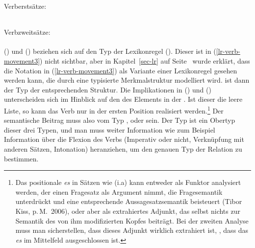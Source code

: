 \eas
Verberstsätze:\\
 \impl\\
\zs

\eas
\label{impl-v2}%
Verbzweitsätze:\\
 \impl\\
\zs
() und () beziehen sich auf den Typ der Lexikonregel ().
Dieser ist in (\ref{lr-verb-movement3}) nicht sichtbar, aber in Kapitel~\ref{sec-lr}
auf Seite~\pageref{pageref-lr-mit-dtr} wurde erklärt, dass die Notation in (\ref{lr-verb-movement3})
als Variante einer Lexikonregel gesehen werden kann, die durch eine typisierte Merkmalstruktur
modelliert wird.  ist dann der Typ der entsprechenden Struktur.
Die Implikationen in () und () unterscheiden sich im Hinblick auf den \slashw
des Elements in der \compsl. Ist dieser die leere Liste, so kann das Verb nur in der ersten
Position realisiert werden.\footnote{
  Das positionale \emph{es} in Sätzen wie (i.a) kann entweder als Funktor analysiert werden, der einen
  Fragesatz als Argument nimmt, die Fragesemantik unterdrückt und eine entsprechende
  Aussagesatzsemantik beisteuert (Tibor Kiss, p.\,M.\ 2006), oder aber als
  extrahiertes Adjunkt, das selbst nichts zur Semantik des von ihm modifizierten Kopfes
  beiträgt. Bei der zweiten Analyse muss man sicherstellen, dass dieses Adjunkt wirklich extrahiert
  ist, \dash, dass das \emph{es} im Mittelfeld ausgeschlossen ist.
\eal
{}
\zllast
}
Der semantische Beitrag muss also vom Typ , 
oder  sein. Der Typ  ist
ein Obertyp dieser drei Typen, und man muss weiter Information wie zum Beispiel Information über
die Flexion des Verbs (Imperativ oder nicht, Verknüpfung mit anderen Sätzen, Intonation) heranziehen,
um den genauen Typ der Relation zu bestimmen.

